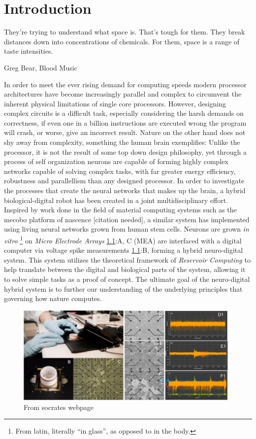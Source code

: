 \chapter{Introduction}
\epigraph{They're trying to understand what space is. That's tough for them.
They break distances down into concentrations of chemicals. For them, space is a
range of taste intensities.}{Greg Bear, Blood Music}
%
In order to meet the ever rising demand for computing speeds modern processor
architectures have become increasingly parallel and complex to circumvent
the inherent physical limitations of single core processors.
%
However, designing complex circuits is a difficult task, especially considering
the harsh demands on correctness, if even one in a billion instructions are
executed wrong the program will crash, or worse, give an incorrect result.
%
Nature on the other hand does not shy away from complexity, something the human
brain exemplifies:
%
Unlike the processor, it is not the result of some top down design
philosophy, yet through a process of self organization neurons are capable of
forming highly complex networks capable of solving complex tasks, with far
greater energy efficiency, robustness and parallellism than any designed
processor.
%
In order to investigate the processes that create the neural networks that makes
up the brain, a hybrid biological-digital robot has been created in a joint
multidisciplinary effort. 
%
Inspired by work done in the field of material computing systems such as the
mecobo platform of nascence [citation needed], a similar system has implemented
using living neural networks grown from human stem cells.
Neurons are grown \emph{in vitro} \footnote{From latin, literally ``in glass'',
as opposed to in the body.} on \emph{Micro Electrode Arrays} \ref{neuroIntro}:A,
C (MEA) are interfaced with a digital computer via voltage spike measurements
\ref{neuroIntro}:B, forming a hybrid neuro-digital system.
%
This system utilizes the theoretical framework of \emph{Reservoir Computing} to
help translate between the digital and biological parts of the system, allowing
it to solve simple tasks as a proof of concept.
%
The ultimate goal of the neuro-digital hybrid system is to further our understanding
of the underlying principles that governing how nature computes.
\begin{figure}[h!]
  \centering
  \includegraphics[width=1\textwidth]{fig/MEA_overview.png}
  \caption{From socrates webpage}
  \label{neuroIntro}
\end{figure}
